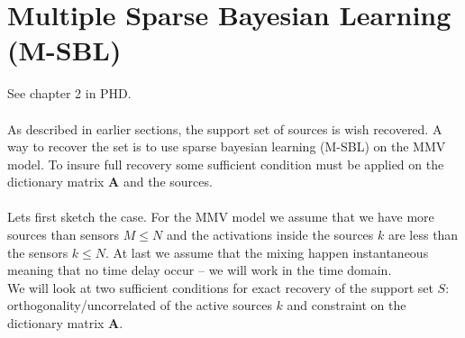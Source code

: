 \section{Multiple Sparse Bayesian Learning (M-SBL)}\label{sec:M-SBL}
See chapter 2 in PHD.
\\ \\
As described in earlier sections, the support set of sources is wish recovered. A way to recover the set is to use sparse bayesian learning (M-SBL) on the MMV model. To insure full recovery some sufficient condition must be applied on the dictionary matrix $\mathbf{A}$ and the sources. 
\\ \\
Lets first sketch the case. For the MMV model we assume that we have more sources than sensors $M \leq N$ and the activations inside the sources $k$ are less than the sensors $k \leq N$. At last we assume that the mixing happen instantaneous meaning that no time delay occur -- we will work in the time domain.
\\
We will look at two sufficient conditions for exact recovery of the support set $S$: orthogonality/uncorrelated of the active sources $k$ and constraint on the dictionary matrix $\mathbf{A}$.

